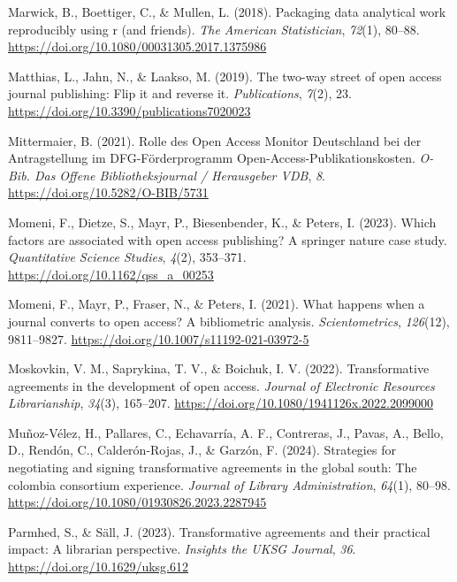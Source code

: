 \documentclass[a4paper,man,floatsintext,longtable,noextraspace,12pt]{apa6}
\newenvironment{CSLReferences}%
  {}%
  {\par}
\begin{document}
\begin{CSLReferences}{1}{0}
\leavevmode{}%
Marwick, B., Boettiger, C., \& Mullen, L. (2018). Packaging data
analytical work reproducibly using r (and friends). \emph{The American
Statistician}, \emph{72}(1), 80--88.
\url{https://doi.org/10.1080/00031305.2017.1375986}

\leavevmode{}%
Matthias, L., Jahn, N., \& Laakso, M. (2019). The two-way street of open
access journal publishing: Flip it and reverse it. \emph{Publications},
\emph{7}(2), 23. \url{https://doi.org/10.3390/publications7020023}

\leavevmode{}%
Mittermaier, B. (2021). {Rolle des Open Access Monitor Deutschland bei
der Antragstellung im DFG-Förderprogramm
Open-Access-Publikationskosten}. \emph{{O-Bib. Das Offene
Bibliotheksjournal / Herausgeber VDB}}, \emph{8}.
\url{https://doi.org/10.5282/O-BIB/5731}

\leavevmode{}%
Momeni, F., Dietze, S., Mayr, P., Biesenbender, K., \& Peters, I.
(2023). Which factors are associated with open access publishing? A
springer nature case study. \emph{Quantitative Science Studies},
\emph{4}(2), 353--371. \url{https://doi.org/10.1162/qss_a_00253}

\leavevmode{}%
Momeni, F., Mayr, P., Fraser, N., \& Peters, I. (2021). What happens
when a journal converts to open access? A bibliometric analysis.
\emph{Scientometrics}, \emph{126}(12), 9811--9827.
\url{https://doi.org/10.1007/s11192-021-03972-5}

\leavevmode{}%
Moskovkin, V. M., Saprykina, T. V., \& Boichuk, I. V. (2022).
Transformative agreements in the development of open access.
\emph{Journal of Electronic Resources Librarianship}, \emph{34}(3),
165--207. \url{https://doi.org/10.1080/1941126x.2022.2099000}

\leavevmode{}%
Muñoz-Vélez, H., Pallares, C., Echavarría, A. F., Contreras, J., Pavas,
A., Bello, D., Rendón, C., Calderón-Rojas, J., \& Garzón, F. (2024).
Strategies for negotiating and signing transformative agreements in the
global south: The colombia consortium experience. \emph{Journal of
Library Administration}, \emph{64}(1), 80--98.
\url{https://doi.org/10.1080/01930826.2023.2287945}

\leavevmode{}%
Parmhed, S., \& Säll, J. (2023). Transformative agreements and their
practical impact: A librarian perspective. \emph{Insights the UKSG
Journal}, \emph{36}. \url{https://doi.org/10.1629/uksg.612}


\end{CSLReferences}
\end{document}
